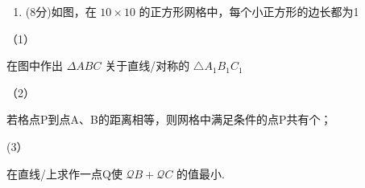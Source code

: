 \begin{enumerate}
\def\labelenumi{\arabic{enumi}.}
\setcounter{enumi}{16}
\tightlist
\item
  (8分)如图，在 \(10 \times 10\) 的正方形网格中，每个小正方形的边长都为1
\end{enumerate}

（1）

在图中作出 \(\Delta A B C\) 关于直线/对称的
\(\triangle A _ { 1 } B _ { 1 } C _ { 1 }\)

（2）

若格点P到点A、B的距离相等，则网格中满足条件的点P共有个；

(3）

在直线/上求作一点Q使 \(\mathcal { Q } B + \mathcal { Q } C\) 的值最小.


